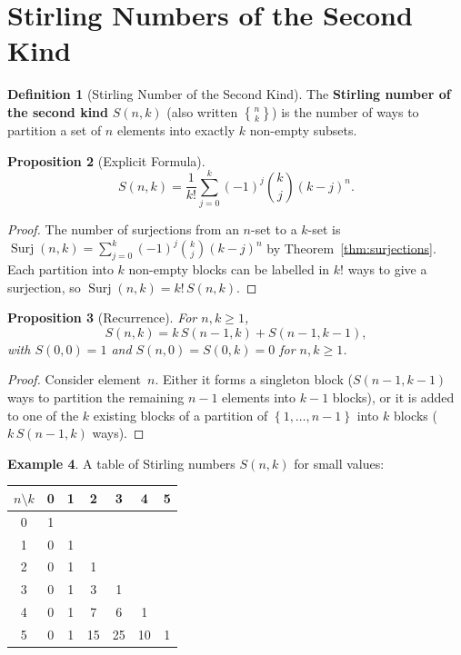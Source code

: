 \documentclass[12pt,a4paper,openany]{book}
\theoremstyle{definition}
\newtheorem{definition}{Definition}[chapter]
\newtheorem{example}[definition]{Example}
\theoremstyle{plain}
\newtheorem{proposition}[definition]{Proposition}
\theoremstyle{remark}
\newcommand{\set}[1]{\left\{#1\right\}}
\begin{document}

\section{Stirling Numbers of the Second Kind}\label{sec:stirling}

\begin{definition}[Stirling Number of the Second Kind]\label{def:stirling-second}
The \textbf{Stirling number of the second kind}
$S(n,k)$ (also written $\genfrac{\{}{\}}{0pt}{}{n}{k}$)
is the number of ways to partition a set of $n$ elements into exactly
$k$ non-empty subsets.
\end{definition}

\begin{proposition}[Explicit Formula]\label{prop:stirling-explicit}
\[
  S(n,k) = \frac{1}{k!}\sum_{j=0}^{k}(-1)^j\binom{k}{j}(k-j)^n.
\]
\end{proposition}

\begin{proof}
The number of surjections from an $n$-set to a $k$-set is
$\operatorname{Surj}(n,k) = \sum_{j=0}^k(-1)^j\binom{k}{j}(k-j)^n$
by Theorem~\ref{thm:surjections}.  Each partition into $k$ non-empty
blocks can be labelled in $k!$ ways to give a surjection, so
$\operatorname{Surj}(n,k) = k!\,S(n,k)$.
\end{proof}

\begin{proposition}[Recurrence]\label{prop:stirling-recurrence}
For $n, k \ge 1$,
\[
  S(n,k) = k\,S(n-1,k) + S(n-1,k-1),
\]
with $S(0,0)=1$ and $S(n,0)=S(0,k)=0$ for $n,k\ge 1$.
\end{proposition}

\begin{proof}
Consider element~$n$.  Either it forms a singleton block
($S(n-1,k-1)$ ways to partition the remaining $n-1$ elements into
$k-1$ blocks), or it is added to one of the $k$ existing blocks of a
partition of $\set{1,\dots,n-1}$ into $k$ blocks ($k\,S(n-1,k)$ ways).
\end{proof}

\begin{example}\label{ex:stirling-table}
A table of Stirling numbers $S(n,k)$ for small values:
\begin{center}
\begin{tabular}{c|cccccc}
  $n \setminus k$ & 0 & 1 & 2 & 3 & 4 & 5 \\ \hline
  0 & 1 \\
  1 & 0 & 1 \\
  2 & 0 & 1 & 1 \\
  3 & 0 & 1 & 3 & 1 \\
  4 & 0 & 1 & 7 & 6  & 1 \\
  5 & 0 & 1 & 15& 25 & 10 & 1
\end{tabular}
\end{center}
\end{example}
\end{document}
